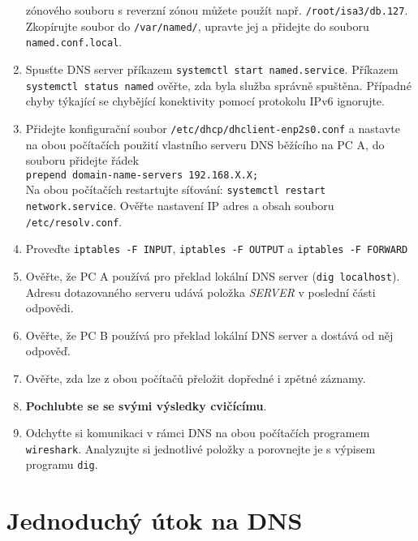 \begin{enumerate}
    zónového souboru s reverzní zónou můžete použít např. {\tt /root/isa3/db.127}.
    Zkopírujte soubor do {\tt /var/named/}, upravte jej a přidejte do
    souboru {\tt named.conf.local}.
  \item Spusťte DNS server příkazem {\tt systemctl start named.service}.
    Příkazem {\tt systemctl status named} ověřte, zda byla služba správně spuštěna.
    Případné chyby týkající se chybějící konektivity pomocí protokolu IPv6 ignorujte.
  \item Přidejte konfigurační soubor {\tt /etc/dhcp/dhclient-enp2s0.conf} a nastavte na obou počítačích
    použití vlastního serveru DNS běžícího na PC A, do souboru přidejte řádek \\
    {\tt prepend domain-name-servers 192.168.X.X;} \\ 
    Na obou počítačích restartujte síťování: {\tt systemctl restart network.service}.
    Ověřte nastavení IP adres a obsah souboru {\tt /etc/resolv.conf}.
  \item Proveďte {\tt iptables -F INPUT}, {\tt iptables -F OUTPUT} a {\tt iptables -F FORWARD}
  \item Ověřte, že PC A používá pro překlad lokální DNS server ({\tt dig
    localhost}). Adresu dotazovaného serveru udává položka {\em SERVER} v
    poslední části odpovědi.
  \item Ověřte, že PC B používá pro překlad lokální DNS server a dostává od něj odpověď.
  \item Ověřte, zda lze z obou počítačů přeložit dopředné i zpětné záznamy.
  \item {\bf Pochlubte se se svými výsledky cvičícímu}.
  \item Odchyťte si komunikaci v rámci DNS na obou počítačích programem
    {\tt wireshark}. Analyzujte si jednotlivé položky a porovnejte je s výpisem
    programu {\tt dig}.

\end{enumerate}

\section{Jednoduchý útok na DNS}

